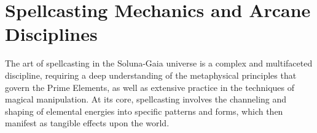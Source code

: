 \documentclass[12pt]{article}
\begin{document}
% 
% 
% 
% 

\section{Spellcasting Mechanics and Arcane Disciplines}

The art of spellcasting in the Soluna-Gaia universe is a complex and multifaceted discipline, requiring a deep understanding of the metaphysical principles that govern the Prime Elements, as well as extensive practice in the techniques of magical manipulation. At its core, spellcasting involves the channeling and shaping of elemental energies into specific patterns and forms, which then manifest as tangible effects upon the world.
\end{document}
